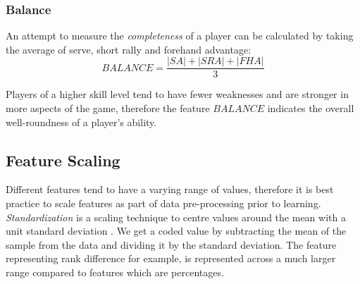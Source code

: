 \subsubsection{Balance} \label{balance}
An attempt to measure the \textit{completeness} of a player can be calculated by taking the average of serve, short rally and forehand advantage:
\begin{equation}
    BALANCE = \frac{|SA|+|SRA|+|FHA|}{3}
\end{equation}

Players of a higher skill level tend to have fewer weaknesses and are stronger in more aspects of the game, therefore the feature $BALANCE$ indicates the overall well-roundness of a player's ability. \label{engineer}

\subsection{Feature Scaling}
Different features tend to have a varying range of values, therefore it is best practice to scale features as part of data pre-processing prior to learning. \textit{Standardization} is a scaling technique to centre values around the mean with a unit standard deviation \cite{bollegala2017dynamic}. We get a coded value by subtracting the mean of the sample from the data and dividing it by the standard deviation. The feature representing rank difference for example, is represented across a much larger range compared to features which are percentages.
